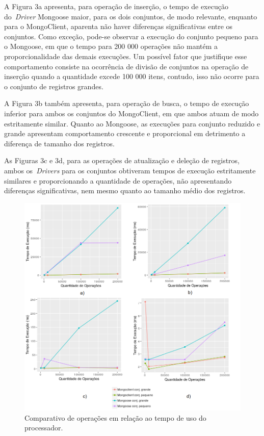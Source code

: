 \documentclass[12pt]{article}
\begin{document}
A Figura 3a apresenta, para operação de inserção, o tempo de execução do~\emph{Driver} Mongoose maior, para os dois conjuntos, de modo relevante, enquanto para o MongoClient, aparenta não haver diferenças significativas entre os conjuntos. 
Como exceção, pode-se observar a execução do conjunto pequeno para o Mongoose, em que o tempo para 200 000 operações não mantém a proporcionalidade das demais execuções. Um possível fator que justifique esse comportamento consiste na ocorrência de divisão de conjuntos na operação de inserção quando a quantidade excede 100 000 itens, contudo, isso não ocorre para o conjunto de registros grandes.

A Figura 3b também apresenta, para operação de busca, o tempo de execução inferior para ambos os conjuntos do MongoClient, em que ambos atuam de modo estritamente similar. 
Quanto ao Mongoose, as execuções para conjunto reduzido e grande apresentam comportamento crescente e proporcional em detrimento a diferença de tamanho dos registros. 

As Figuras 3c e 3d, para as operações de atualização e deleção de registros, ambos os~\emph{Drivers} para os conjuntos obtiveram tempos de execução estritamente similares e proporcionando a quantidade de operações, não apresentando diferenças significativas, nem mesmo quanto ao tamanho médio dos registros.

\begin{figure}[!ht]
    \centering
    \includegraphics[width=\textwidth]{images/cpuusage}
    \caption{Comparativo de operações em relação ao tempo de uso do processador.}
    \label{fig:cpuusage}
\end{figure}
\end{document}
